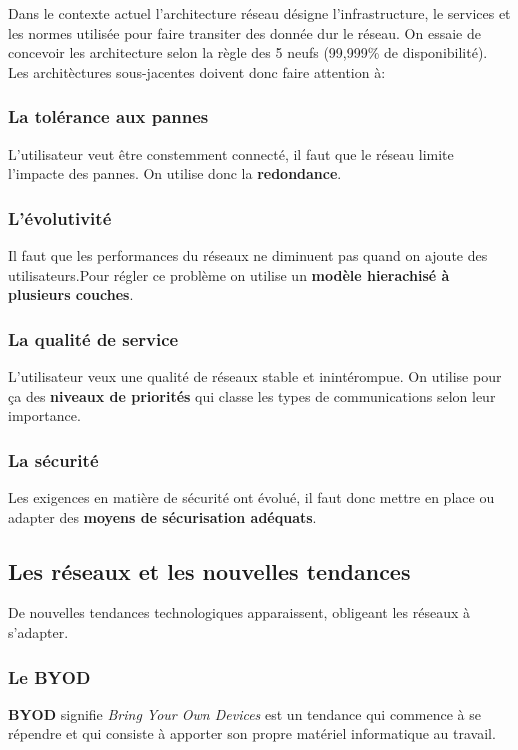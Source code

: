 \documentclass[10pt,a4paper]{article}
\begin{document}
 \indent
 Dans le contexte actuel l'architecture réseau désigne l'infrastructure, le services et les normes utilisée pour faire transiter des donnée dur le réseau. On essaie de concevoir les architecture selon la règle des 5 neufs (99,999\% de disponibilité). Les architèctures sous-jacentes doivent donc faire attention à:

 \subsubsection{La tolérance aux pannes}
 L'utilisateur veut être constemment connecté, il faut que le réseau limite l'impacte des pannes. On utilise donc la \textbf{redondance}.

 \subsubsection{L'évolutivité}
 Il faut que les performances du réseaux ne diminuent pas quand on ajoute des utilisateurs.Pour régler ce problème on utilise un \textbf{modèle hierachisé à plusieurs couches}.

 \subsubsection{La qualité de service}
 L'utilisateur veux une qualité de réseaux stable et inintérompue. On utilise pour ça des \textbf{niveaux de priorités} qui classe les types de communications selon leur importance.

 \subsubsection{La sécurité}
 Les exigences en matière de sécurité ont évolué, il faut donc mettre en place ou adapter des \textbf{moyens de sécurisation adéquats}.

 \subsection{Les réseaux et les nouvelles tendances}
 De nouvelles tendances technologiques apparaissent, obligeant les réseaux à s'adapter.

 \subsubsection{Le BYOD}
 \textbf{BYOD} signifie \textit{Bring Your Own Devices} est un tendance qui commence à se répendre et qui consiste à apporter son propre matériel informatique au travail.
\end{document}
